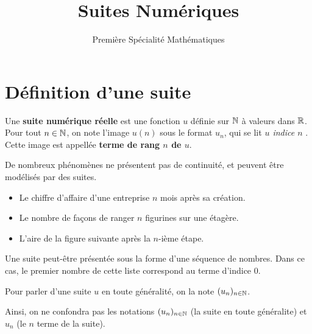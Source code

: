 \documentclass{poly}
\title{Suites Numériques}
\author{Première Spécialité Mathématiques}
\date{}
\begin{document}
\maketitle
\section{Définition d'une suite}
\begin{definition}
Une \textbf{suite numérique réelle} est une fonction $u$ définie sur $\mathbb{N}$ à valeurs dans $\mathbb{R}$. Pour tout $n \in \mathbb{N}$, on note l'image $u(n)$ sous le format $u_n$, qui se lit \emph{\og $u$ indice $n$ \fg}. Cette image est appellée \textbf{terme de rang $n$ de $u$}.
\end{definition}
\begin{example}
De nombreux phénomènes ne présentent pas de continuité, et peuvent être modélisés par des suites.
\begin{itemize}
\item Le chiffre d'affaire d'une entreprise $n$ mois après sa création.
\item Le nombre de façons de ranger $n$ figurines sur une étagère.
\item L'aire de la figure suivante après la $n$-ième étape.
\begin{center}
\end{center}
\end{itemize}
\end{example}
\begin{remark}
Une suite peut-être présentée sous la forme d'une séquence de nombres. Dans ce cas, le premier nombre de cette liste correspond au terme d'indice $0$.
\end{remark}
\begin{tcolorbox}
Pour parler d'une suite $u$ en toute généralité, on la note $(u_n)_{n \in \mathbb{N}}$.
\end{tcolorbox}
\begin{remark}
Ainsi, on ne confondra pas les notations $(u_n)_{n \in \mathbb{N}}$ (la suite en toute généralite) et $u_n$ (le $n$\ieme{} terme de la suite).
\end{remark}
\end{document}

